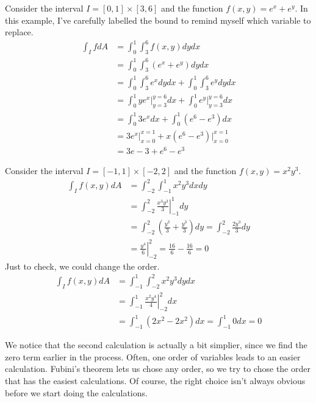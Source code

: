 \documentclass[fleqn,letterpaper]{report}
\begin{document}
\begin{example}
Consider the interval $I = [0,1] \times[3,6]$ and the function
$f(x,y) = e^x + e^y$. In this example, I've carefully
labelled the bound to remind myself which variable to replace.
\begin{align*}
\int_I f dA & = \int_0^1 \int_3^6 f(x,y) dy dx \\
& = \int_0^1 \int_3^6 (e^x + e^y) dy dx \\
& = \int_0^1 \int_3^6 e^x dy dx + 
\int_0^1 \int_3^6 e^y dy dx \\
& = \int_0^1 y e^x \bigg|_{y=3}^{y=6} dx + 
\int_0^1 e^y \bigg|_{y=3}^{y=6} dx \\
& = \int_0^1 3e^x dx + \int_0^1 (e^6-e^3) dx \\
& = 3e^x \bigg|_{x=0}^{x=1} + 
x(e^6-e^3) \bigg|_{x=0}^{x=1} \\
& = 3e - 3 + e^6 - e^3
\end{align*}
\end{example}

\begin{example}
Consider the interval $I = [-1,1] \times [-2,2]$ and the
function $f(x,y) = x^2y^3$.
\begin{align*}
\int_I f(x,y) dA & = \int_{-2}^2 \int_{-1}^1 x^2 y^3 dx dy \\
& = \int_{-2}^2 \left. \frac{x^3y^3}{3} \right|_{-1}^1 dy \\
& = \int_{-2}^2 \left( \frac{y^3}{3} + \frac{y^3}{3} \right)
dy = \int_{-2}^2 \frac{2y^3}{3} dy \\
& = \left. \frac{y^4}{6} \right|_{-2}^{2} = \frac{16}{6} -
\frac{16}{6} = 0
\end{align*}
Just to check, we could change the order.
\begin{align*}
\int_I f(x,y) dA & = \int_{-1}^1 \int_{-2}^2 x^2 y^3 dy dx \\
& = \int_{-1}^1 \left. \frac{x^2y^4}{4} \right|_{-2}^2 dx \\
& = \int_{-1}^1 (2x^2 - 2x^2) dx = \int_{-1}^1 0 dx = 0
\end{align*}
\end{example}

We notice that the second calculation is actually a
bit simplier, since we find the zero term earlier in the
process. Often, one order of
variables leads to an easier calculation. Fubini's theorem
lets us chose any order, so we try to chose the order that has
the easiest calculations. Of course, the right choice isn't always
obvious before we start doing the calculations.
\end{document}
